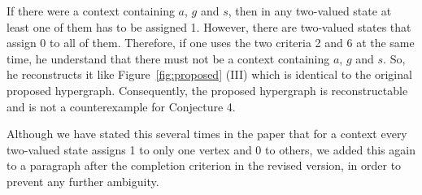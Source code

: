 \documentclass[12pt,a4paper]{article}
\theoremstyle{definition}
\numberwithin{equation}{section}
\begin{document}
If there were a context containing $a$, $g$ and $s$, then in any two-valued state at least one of them has to be assigned 1. However, there are two-valued states that assign 0 to all of them. Therefore, if one uses the two criteria 2 and 6 at the same time, he understand that there must not be a context containing $a$, $g$ and $s$. So, he reconstructs it like Figure~\ref{fig:proposed} (III) which is identical to the original proposed hypergraph. Consequently, the proposed hypergraph is reconstructable and is not a counterexample for Conjecture 4.

Although we have stated this several times in the paper that for a context every two-valued state assigns 1 to only one vertex and 0 to others, we added this again to a paragraph after the completion criterion in the revised version, in order to prevent any further ambiguity.
\end{document}
